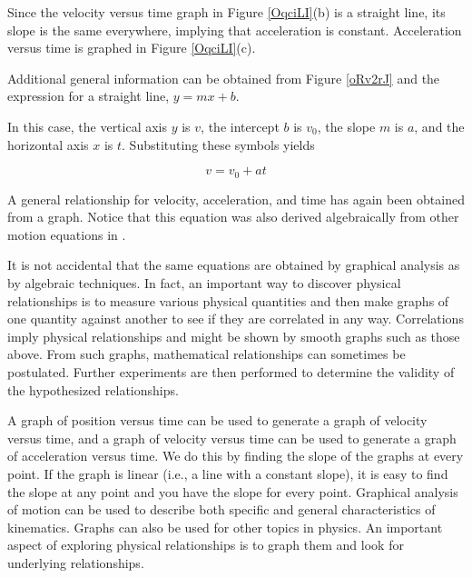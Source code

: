 \documentclass[dvipsnames]{article}
\begin{document}
Since the velocity versus time graph in Figure \ref{OqciLI}(b) is a straight line, its slope is the same everywhere, implying that acceleration is constant. Acceleration versus time is graphed in Figure \ref{OqciLI}(c).

\vspace{1em}

Additional general information can be obtained from Figure \ref{oRv2rJ} and the expression for a straight line, $y = mx + b$.

\vspace{1em}

In this case, the vertical axis $y$ is $v$, the intercept $b$ is $v_0$, the slope $m$ is $a$, and the horizontal axis $x$ is $t$. Substituting these symbols yields

\begin{equation}
    v = v_0 + at
\end{equation}

A general relationship for velocity, acceleration, and time has again been obtained from a graph. Notice that this equation was also derived algebraically from other motion equations in .

\vspace{1em}

It is not accidental that the same equations are obtained by graphical analysis as by algebraic techniques. In fact, an important way to discover physical relationships is to measure various physical quantities and then make graphs of one quantity against another to see if they are correlated in any way. Correlations imply physical relationships and might be shown by smooth graphs such as those above. From such graphs, mathematical relationships can sometimes be postulated. Further experiments are then performed to determine the validity of the hypothesized relationships.



A graph of position versus time can be used to generate a graph of velocity versus time, and a graph of velocity versus time can be used to generate a graph of acceleration versus time. We do this by finding the slope of the graphs at every point. If the graph is linear (i.e., a line with a constant slope), it is easy to find the slope at any point and you have the slope for every point. Graphical analysis of motion can be used to describe both specific and general characteristics of kinematics. Graphs can also be used for other topics in physics. An important aspect of exploring physical relationships is to graph them and look for underlying relationships.

\end{document}
